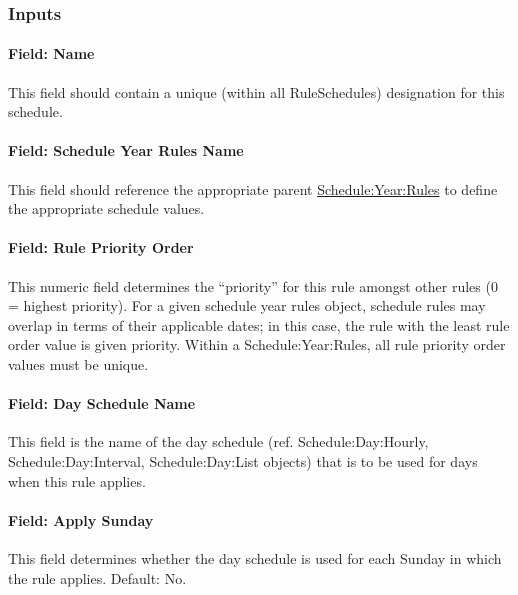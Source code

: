 \subsubsection{Inputs}\label{inputs-scheduleweekrule}

\paragraph{Field: Name}\label{field-name-scheduleweekrule}

This field should contain a unique (within all RuleSchedules) designation for this schedule.

\paragraph{Field: Schedule Year Rules Name}\label{field-schedule-year-rules-name-scheduleweekrule}

This field should reference the appropriate parent \hyperref[scheduleyearrules]{Schedule:Year:Rules} to define the appropriate schedule values.

\paragraph{Field: Rule Priority Order}\label{field-rule-priority-order-scheduleweekrule}

This numeric field determines the ``priority'' for this rule amongst other rules (0 = highest priority).
For a given schedule year rules object, schedule rules may overlap in terms of their applicable dates; in this case, the rule with the least rule order value is given priority.
Within a Schedule:Year:Rules, all rule priority order values must be unique.

\paragraph{Field: Day Schedule Name}\label{field-day-schedule-name-scheduleweekrule}

This field is the name of the day schedule (ref. Schedule:Day:Hourly, Schedule:Day:Interval, Schedule:Day:List objects) that is to be used for days when this rule applies.

\paragraph{Field: Apply Sunday}\label{field-apply-sunday-scheduleweekrule}

This field determines whether the day schedule is used for each Sunday in which the rule applies.
Default: No.

